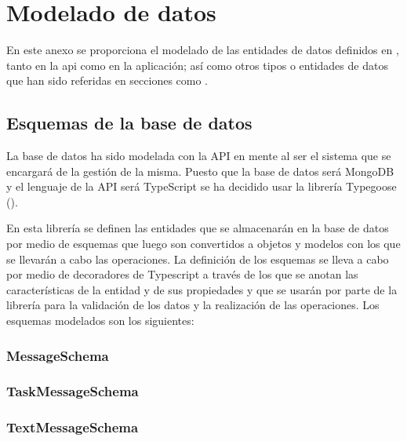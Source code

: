 \chapter{Modelado de datos}
\label{ch:modelado_datos}

En este anexo se proporciona el modelado de las entidades de datos definidos en , tanto en la \acrshort{api} como en la aplicación; así como otros tipos o entidades de datos que han sido referidas en secciones como .

\section{Esquemas de la base de datos}

La base de datos ha sido modelada con la API en mente al ser el sistema que se encargará de la gestión de la misma. Puesto que la base de datos será MongoDB y el lenguaje de la API será TypeScript se ha decidido usar la librería Typegoose (). 

En esta librería se definen las entidades que se almacenarán en la base de datos por medio de esquemas que luego son convertidos a objetos y modelos con los que se llevarán a cabo las operaciones. La definición de los esquemas se lleva a cabo por medio de decoradores de Typescript a través de los que se anotan las características de la entidad y de sus propiedades y que se usarán por parte de la librería para la validación de los datos y la realización de las operaciones. Los esquemas modelados son los siguientes:

\subsection{MessageSchema}
\label{sch:message}



\subsection{TaskMessageSchema}
\label{sch:task_message}


\subsection{TextMessageSchema}
\label{sch:text_message}


